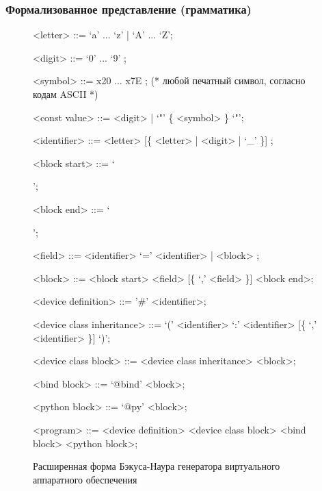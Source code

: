 \begin{frame}%
    \frametitle{Формализованное представление (грамматика)}
    \begin{figure}[!htbp]
        \begin{adjustbox}{max totalsize={\textwidth}{\textheight}}
            \begin{minipage}{\linewidth}
                {\footnotesize
                \setlength{\grammarparsep}{0.02cm}
                \setlength{\grammarindent}{13em}
                \begin{grammar}{}
                    <letter> ::= `a' ... `z' | `A' ... `Z';

                    <digit> ::= `0' ... `9' ;

                    <symbol> ::= x20 ... x7E ; (* любой печатный символ, согласно кодам ASCII *)

                    <const value> ::= <digit> | `"' \{ <symbol> \} `"';

                    <identifier> ::= <letter> [\{ <letter> | <digit> | `\_' \}] ;

                    <block start> ::= `{';

                    <block end> ::= `}';

                    <field> ::= <identifier> `=' <identifier> | <block> ;

                    <block> ::= <block start> <field> [\{ `,' <field> \}] <block end>;

                    <device definition> ::= '\#' <identifier>;

                    <device class inheritance> ::= `(' <identifier> `:' <identifier> [\{ `,' <identifier> \}] `)';

                    <device class block> ::= <device class inheritance> <block>;

                    <bind block> ::= `@bind' <block>;

                    <python block> ::= `@py' <block>;

                    <program> ::= <device definition> <device class block> <bind block> <python block>;
                \end{grammar}
                }
            \end{minipage}
        \end{adjustbox}
        \caption{Расширенная форма Бэкуса-Наура генератора виртуального аппаратного обеспечения}
    \end{figure}
\end{frame}


